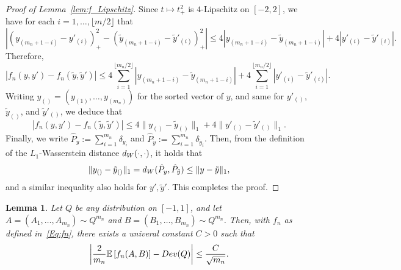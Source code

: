 \documentclass[12pt]{article}
\newtheorem{lemma}[theorem]{Lemma}
\newcommand{\EE}[1]{\mathbb{E}\left[{#1}\right]}
\begin{document}
\begin{proof}[Proof of Lemma~\ref{lem:f_Lipschitz}]
    Since $t\mapsto t^2_+$ is $4$-Lipschitz on $[-2,2]$, we have for each $i=1,\ldots,\lfloor m/2 \rfloor$ that
    \[\left|(y_{(m_n+1-i)} - y'_{(i)})^2_+ - (\tilde{y}_{(m_n+1-i)} - \tilde{y}'_{(i)})^2_+\right|\leq 4|y_{(m_n+1-i)} - \tilde{y}_{(m_n+1-i)}|
    + 4|y'_{(i)} - \tilde{y}'_{(i)}|.\]
    Therefore, 
    \[
    \left|f_n(y,y') - f_n(\tilde{y},\tilde{y}')\right|
    \leq 4\sum_{i=1}^{\lfloor m_n/2\rfloor}|y_{(m_n+1-i)} - \tilde{y}_{(m_n+1-i)}| + 4\sum_{i=1}^{\lfloor m_n/2\rfloor} |y'_{(i)} - \tilde{y}'_{(i)}|.
    \]
    Writing $y_{()} = (y_{(1)},\dots,y_{(m_n)})$ for the sorted vector of $y$, and same for $y'_{()}$, $\tilde{y}_{()}$, and $\tilde{y}'_{()}$, we deduce that
    \[
    \left|f_n(y,y') - f_n(\tilde{y},\tilde{y}')\right|
    \leq 4\|y_{()} - \tilde{y}_{()}\|_1 + 4\|y'_{()} - \tilde{y}'_{()}\|_1.
    \]
    Finally, we write $\hat{P}_{y}:=\sum_{i=1}^{m_n} \delta_{y_i}$ and $\hat{P}_{\tilde{y}}:=\sum_{i=1}^{m_n} \delta_{\tilde{y}_i}$. Then, from the definition of the $L_1$-Wasserstein distance ${\rm d}_{\rm W}(\cdot,\cdot)$, it holds that
    \[
    \|y_{()} - \tilde{y}_{()}\|_1 = {\rm d}_{\rm W}(\hat{P}_{y},\hat{P}_{\tilde{y}})\leq \|y - \tilde{y}\|_1,\]
     and a similar inequality also holds for $y',\tilde{y}'$. This completes the proof.
\end{proof}
\begin{lemma}\label{lem:f_div}
    Let $Q$ be any distribution on $[-1,1]$, and let $A=(A_1,\dots,A_{m_n})\sim Q^{m_n}$ and $B=(B_1,\dots,B_{m_n})\sim Q^{m_n}$. Then, with $f_n$ as defined in~\eqref{Eq:fn}, there exists a univeral constant $C > 0$ such that
    \[
    \biggl|\frac{2}{m_n}\EE{f_n(A,B)} - \textnormal{Dev}(Q)\biggr| \leq \frac{C}{\sqrt{m_n}}.
    \]
\end{lemma}
\end{document}
